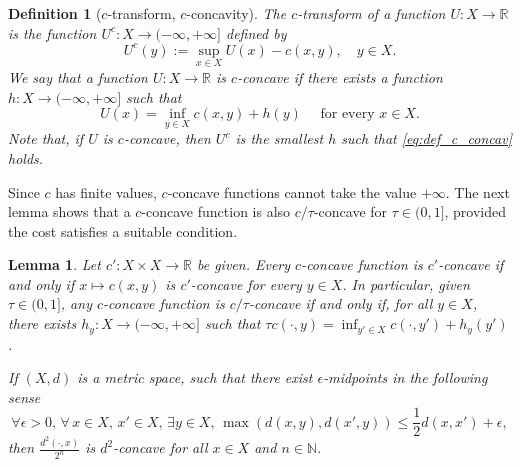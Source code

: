 \documentclass[reqno]{amsart}
\newcounter{results}[section]
\theoremstyle{plain}
\newtheorem{lemma}[results]{Lemma}
\theoremstyle{remark}
\theoremstyle{plain}
\newtheorem{definition}[results]{Definition}
\numberwithin{equation}{section}
\theoremstyle{remark}
\newcommand{\N}{\mathbb{N}}
\newcommand{\R}{\mathbb{R}}
\begin{document}
\begin{definition}[$c$-transform, $c$-concavity] \label{def:c-transform}  
    The \emph{$c$-transform} of a function $U\colon X\to\R$ is the function $U^c\colon  X \to(-\infty, +\infty]$ defined by 
        \begin{equation} \label{eq:def-c-transform}
            U^c(y):=\sup_{x\in X} U(x)-c(x,y),  \quad y \in X.
        \end{equation}
    We say that a function $U\colon X\to\R$ is $c$-concave if there exists a function $h\colon  X \to (-\infty, +\infty]$ such that
    \begin{equation}\label{eq:def_c_concav}
         U(x)=\inf_{y\in  X }c(x,y)+h(y)\quad \text{ for every } x \in X.
    \end{equation}
     Note that, if $U$ is $c$-concave, then $U^c$ is the smallest $h$ such that \eqref{eq:def_c_concav} holds.
\end{definition}
Since $c$ has finite values, $c$-concave functions cannot take the value $+\infty$. The next lemma shows that a $c$-concave function is also $c/\tau$-concave for $\tau \in (0,1]$, provided the cost satisfies a suitable condition. 
\begin{lemma}
    Let $c':X\times  X \to \R$ be  given.  
    Every $c$-concave function is $c'$-concave if and only if $ x \mapsto c(x,y)$ is $c'$-concave for every $y \in  X $. In particular, given $\tau \in (0,1]$,  any  $c$-concave function is $c/\tau$-concave if and only if, for all $y\in  X $, there exists $h_y: X \to (-\infty, +\infty]$ such that $\tau c(\cdot,y)=\inf_{y'\in  X } c(\cdot,y')+h_y(y')$.

    If $(X,d)$ is a metric space,   such that there exist {\it $\epsilon$-midpoints} in the following sense 
    \begin{equation}
        \forall \epsilon>0,\, \forall \, x\in X,\, x'\in X, \, \exists y\in X , \, \max(d(x,y),d(x',y))\le \frac12 d(x,x')+\epsilon,
    \end{equation}
      then $\frac{d^2(\cdot,x)}{2^n}$ is $d^2$-concave for all $x\in X$ and $n\in\N$. 
\end{lemma}
\end{document}
